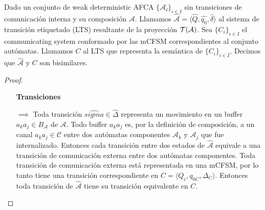 \begin{prop} Dado un conjunto de weak deterministic AFCA $\{\mathcal{A_i}\}_{i \in I}$ sin transiciones de comunicación interna y su composición $\mathcal{A}$. Llamamos $\hat{\mathcal{A}}=\langle \hat{Q}, \hat{q_0}, \hat{\delta} \rangle$ al sistema de transición etiquetado (LTS) resultante de la proyección $\mathcal{T}(\mathcal{A})$. Sea $\{C_i\}_{i \in I}$ el communicating system conformado por las mCFSM correspondientes al conjunto autómatas. Llamamos $C$ al LTS que representa la semántica de $\{C_i\}_{i \in I}$. Decimos que $\hat{\mathcal{A}}$ y $C$ son bisimilares.

\begin{proof}

\begin{itemize}
    \item[\textbf{Transiciones}]
    \item[$\implies$]Toda transición $\hat{sigma} \in \hat{\Delta}$ representa un movimiento en un buffer $a_ka_j \in B_{\mathcal{A}}$ de $\mathcal{A}$. Todo buffer $a_ka_j$ es, por la definición de composición, a un canal $a_ka_j \in \mathcal{C}$ entre dos autómatas componentes $\mathcal{A}_k$ y $\mathcal{A}_j$ que fue internalizado. Entonces cada transición entre dos estados de $\hat{\mathcal{A}}$ equivale a una transición de comunicación externa entre dos autómatas componentes. Toda transición de comunicación externa está representada en una mCFSM, por lo tanto tiene una transición correspondiente en $C = \langle Q_c, q_{0C}, \Delta_C \rangle$. Entonces toda transición de $\hat{\mathcal{A}}$ tiene su transición equivalente en $C$. 


\end{itemize}
\end{proof}
\end{prop}
